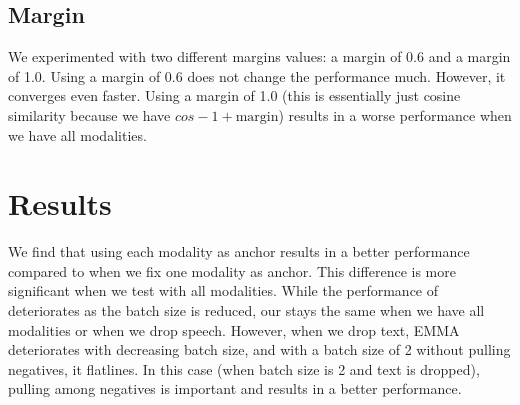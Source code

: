 \subsection{Margin}
We experimented with two different margins values: a margin of 0.6 and a margin of 1.0. Using a margin of 0.6 does not change the performance much. However, it converges even faster. Using a margin of 1.0 (this is essentially just cosine similarity because we have $cos -1 + \text{margin}$) results in a worse performance when we have all modalities. 





\section{Results}
We find that using each modality as anchor results in a better performance compared to when we fix one modality as anchor. This difference is more significant when we test with all modalities. 
% 
While the performance of \supcon{} deteriorates as the batch size is reduced, our \geom{} stays the same when we have all modalities or when we drop speech. However, when we drop text, EMMA deteriorates with decreasing batch size, and with a batch size of 2 without pulling negatives, it flatlines. In this case (when batch size is 2 and text is dropped), pulling among negatives is important and results in a better performance.






